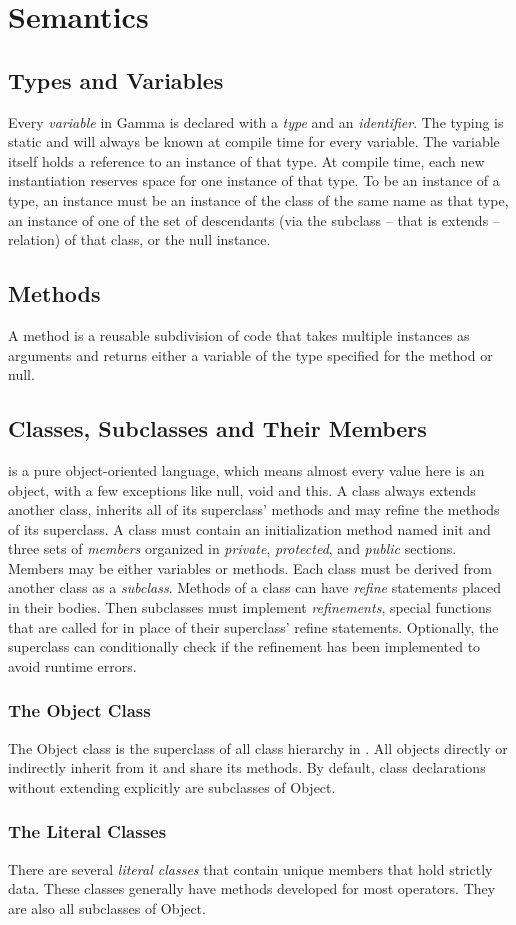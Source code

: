 \section{Semantics}
\subsection{Types and Variables}
Every \textit{variable} in Gamma is declared with a \textit{type} and an \textit{identifier}. The typing is static and will always be known at compile time for every variable. The variable itself holds a reference to an instance of that type. At compile time, each new instantiation reserves space for one instance of that type. To be an instance of a type, an instance must be an instance of the class of the same name as that type, an instance of one of the set of descendants (via the subclass -- that is extends -- relation) of that class, or the null instance.
\subsection{Methods}
A method is a reusable subdivision of code that takes multiple instances as arguments and returns either a variable of the type specified for the method or null.
\subsection{Classes, Subclasses and Their Members}
\Lang{} is a pure object-oriented language, which means almost every value here is an object, with a few exceptions like null, void and this. A class always extends another class, inherits all of its superclass' methods and may refine the methods of its superclass. A class must contain an initialization method named init and three sets of \textit{members} organized in \textit{private}, \textit{protected}, and \textit{public} sections. Members may be either variables or methods. Each class must be derived from another class as a \textit{subclass}. Methods of a class can have \textit{refine} statements placed in their bodies. Then subclasses must implement \textit{refinements}, special functions that are called for in place of their superclass' refine statements. Optionally, the superclass can conditionally check if the refinement has been implemented to avoid runtime errors.
\subsubsection{The Object Class}
The Object class is the superclass of all class hierarchy in \Lang{}. All objects directly or indirectly inherit from it and share its methods. By default, class declarations without extending explicitly are subclasses of Object.
\subsubsection{The Literal Classes}
There are several \textit{literal classes} that contain unique members that hold strictly data. These classes generally have methods developed for most operators. They are also all subclasses of Object.

